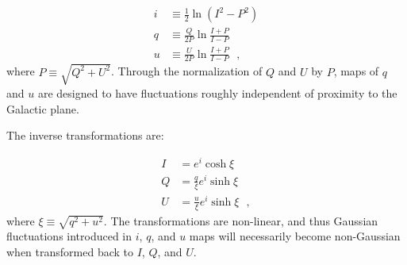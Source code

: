 \documentclass[twocolumn]{aastex631}
\begin{document}
\begin{align}\label{eq:real2pt}
    i &\equiv \frac{1}{2} \ln (I^2 - P^2)\nonumber  \\
    q &\equiv  \frac{Q}{2P} \ln \frac{I+P}{I-P} \\
    u &\equiv  \frac{U}{2P} \ln \frac{I+P}{I-P}\nonumber 
    ~~~,
\end{align}
where $P \equiv \sqrt{Q^2 + U^2}$. Through the normalization of $Q$ and $U$ by $P$, maps of $q$ and $u$ are designed to have fluctuations roughly independent of proximity to the Galactic plane. %

The inverse transformations are:

\begin{align}\label{eq:pt2real}
    I &= e^i \cosh \xi \nonumber \\
    Q &= \frac{q}{\xi}e^i\sinh \xi  \\
    U &= \frac{u}{\xi}e^i\sinh \xi \nonumber
    ~~~,
\end{align}
where $\xi \equiv \sqrt{q^2 + u^2}$. The transformations are non-linear, and thus Gaussian fluctuations introduced in $i$, $q$, and $u$ maps will necessarily become non-Gaussian when transformed back to $I$, $Q$, and $U$.

\end{document}
